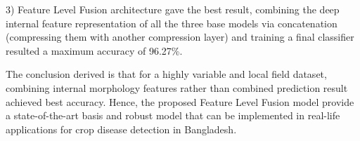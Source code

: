 3) Feature Level Fusion architecture gave the best result, combining the deep internal feature representation of all the three base models via concatenation (compressing them with another compression layer) and training a final classifier resulted a maximum accuracy of 96.27\%. 

The conclusion derived is that for a highly variable and local field dataset, combining internal morphology features rather than combined prediction result achieved best accuracy. Hence, the proposed Feature Level Fusion model provide a state-of-the-art basis and robust model that can be implemented in real-life applications for crop disease detection in Bangladesh.